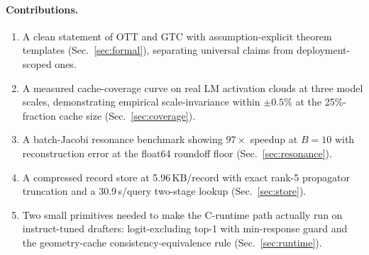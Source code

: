 \documentclass[11pt]{article}
\begin{document}
\paragraph{Contributions.}
\begin{enumerate}
  \item A clean statement of OTT and GTC with assumption-explicit theorem
        templates (Sec.~\ref{sec:formal}), separating universal claims from
        deployment-scoped ones.
  \item A measured cache-coverage curve on real LM activation clouds at three
        model scales, demonstrating empirical scale-invariance within
        $\pm 0.5\%$ at the 25\%-fraction cache size (Sec.~\ref{sec:coverage}).
  \item A batch-Jacobi resonance benchmark showing $97\times$ speedup at
        $B=10$ with reconstruction error at the float64 roundoff floor
        (Sec.~\ref{sec:resonance}).
  \item A compressed record store at 5.96\,KB/record with exact rank-5
        propagator truncation and a 30.9\,\textmu s/query two-stage lookup
        (Sec.~\ref{sec:store}).
  \item Two small primitives needed to make the C-runtime path actually run on
        instruct-tuned drafters: logit-excluding top-1 with min-response
        guard and the geometry-cache consistency-equivalence rule
        (Sec.~\ref{sec:runtime}).
\end{enumerate}
\end{document}
